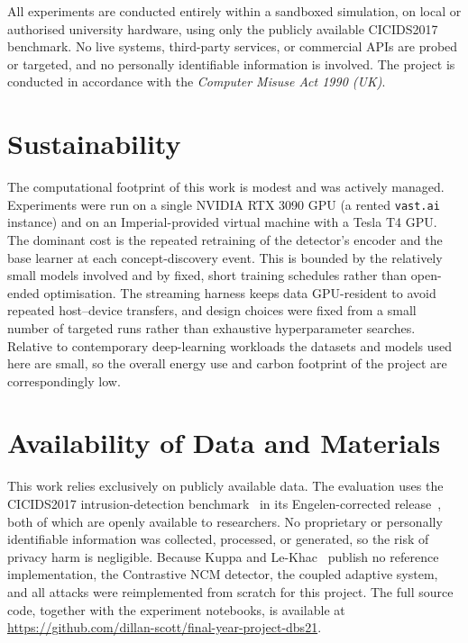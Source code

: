 All experiments are conducted entirely within a sandboxed simulation, on local or authorised university hardware, using only the publicly available CICIDS2017 benchmark. No live systems, third-party services, or commercial APIs are probed or targeted, and no personally identifiable information is involved. The project is conducted in accordance with the \emph{Computer Misuse Act 1990 (UK)}.

\section{Sustainability}
The computational footprint of this work is modest and was actively managed. Experiments were run on a single NVIDIA RTX 3090 GPU (a rented \texttt{vast.ai} instance) and on an Imperial-provided virtual machine with a Tesla T4 GPU. The dominant cost is the repeated retraining of the detector's encoder and the base learner at each concept-discovery event. This is bounded by the relatively small models involved and by fixed, short training schedules rather than open-ended optimisation. The streaming harness keeps data GPU-resident to avoid repeated host--device transfers, and design choices were fixed from a small number of targeted runs rather than exhaustive hyperparameter searches. Relative to contemporary deep-learning workloads the datasets and models used here are small, so the overall energy use and carbon footprint of the project are correspondingly low.

\section{Availability of Data and Materials}
This work relies exclusively on publicly available data. The evaluation uses the CICIDS2017 intrusion-detection benchmark~\cite{Sharafaldin_2018} in its Engelen-corrected release~\cite{Engelen_2021}, both of which are openly available to researchers. No proprietary or personally identifiable information was collected, processed, or generated, so the risk of privacy harm is negligible. Because Kuppa and Le-Khac~\cite{Kuppa_2022} publish no reference implementation, the Contrastive NCM detector, the coupled adaptive system, and all attacks were reimplemented from scratch for this project. The full source code, together with the experiment notebooks, is available at \url{https://github.com/dillan-scott/final-year-project-dbs21}.